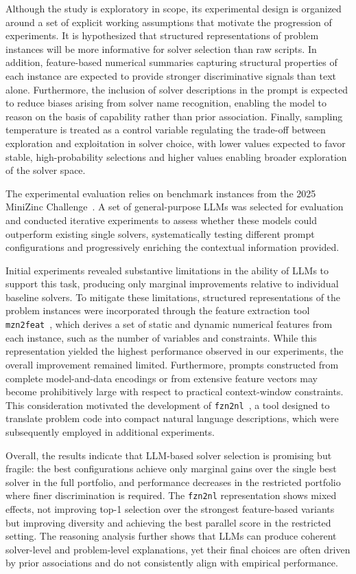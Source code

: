 \documentclass[../../main]{subfiles}
\begin{document}
Although the study is exploratory in scope, its experimental design is organized around a set of explicit working assumptions that motivate the progression of experiments. It is hypothesized that structured representations of problem instances will be more informative for solver selection than raw scripts. In addition, feature-based numerical summaries capturing structural properties of each instance are expected to provide stronger discriminative signals than text alone. Furthermore, the inclusion of solver descriptions in the prompt is expected to reduce biases arising from solver name recognition, enabling the model to reason on the basis of capability rather than prior association. Finally, sampling temperature is treated as a control variable regulating the trade-off between exploration and exploitation in solver choice, with lower values expected to favor stable, high-probability selections and higher values enabling broader exploration of the solver space.

The experimental evaluation relies on benchmark instances from the 2025 MiniZinc Challenge~\cite{PhilMznChallenge,MznResults25}. A set of general-purpose LLMs was selected for evaluation and conducted iterative experiments to assess whether these models could outperform existing single solvers, systematically testing different prompt configurations and progressively enriching the contextual information provided.

Initial experiments revealed substantive limitations in the ability of LLMs to support this task, producing only marginal improvements relative to individual baseline solvers. To mitigate these limitations, structured representations of the problem instances were incorporated through the feature extraction tool \texttt{mzn2feat}~\cite{mzn2feat}, which derives a set of static and dynamic numerical features from each instance, such as the number of variables and constraints. While this representation yielded the highest performance observed in our experiments, the overall improvement remained limited. Furthermore, prompts constructed from complete model-and-data encodings or from extensive feature vectors may become prohibitively large with respect to practical context-window constraints. This consideration motivated the development of \texttt{fzn2nl}~\cite{fzn2nl}, a tool designed to translate problem code into compact natural language descriptions, which were subsequently employed in additional experiments.

Overall, the results indicate that LLM-based solver selection is promising but fragile: the best configurations achieve only marginal gains over the single best solver in the full portfolio, and performance decreases in the restricted portfolio where finer discrimination is required. The \texttt{fzn2nl} representation shows mixed effects, not improving top-1 selection over the strongest feature-based variants but improving diversity and achieving the best parallel score in the restricted setting. The reasoning analysis further shows that LLMs can produce coherent solver-level and problem-level explanations, yet their final choices are often driven by prior associations and do not consistently align with empirical performance.
\end{document}
